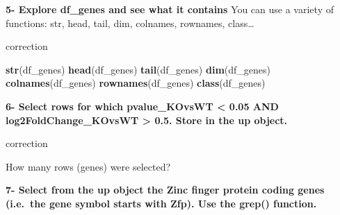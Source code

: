 \documentclass[]{book}
\newenvironment{Shaded}{\begin{snugshade}}{\end{snugshade}}
\newcommand{\CommentTok}[1]{\textcolor[rgb]{0.56,0.35,0.01}{\textit{#1}}}
\newcommand{\FloatTok}[1]{\textcolor[rgb]{0.00,0.00,0.81}{#1}}
\newcommand{\KeywordTok}[1]{\textcolor[rgb]{0.13,0.29,0.53}{\textbf{#1}}}
\newcommand{\NormalTok}[1]{#1}
\newcommand{\OperatorTok}[1]{\textcolor[rgb]{0.81,0.36,0.00}{\textbf{#1}}}
\newcommand{\StringTok}[1]{\textcolor[rgb]{0.31,0.60,0.02}{#1}}
\begin{document}
\textbf{5- Explore df\_genes and see what it contains}
You can use a variety of functions: str, head, tail, dim, colnames, rownames, class\ldots{}

correction

\begin{Shaded}
\begin{Highlighting}[]
\KeywordTok{str}\NormalTok{(df_genes)}
\KeywordTok{head}\NormalTok{(df_genes)}
\KeywordTok{tail}\NormalTok{(df_genes)}
\KeywordTok{dim}\NormalTok{(df_genes)}
\KeywordTok{colnames}\NormalTok{(df_genes)}
\KeywordTok{rownames}\NormalTok{(df_genes)}
\KeywordTok{class}\NormalTok{(df_genes)}
\end{Highlighting}
\end{Shaded}

\textbf{6- Select rows for which pvalue\_KOvsWT \textless{} 0.05 AND log2FoldChange\_KOvsWT \textgreater{} 0.5. Store in the up object.}

correction

\begin{Shaded}
\end{Shaded}

How many rows (genes) were selected?

\textbf{7- Select from the up object the Zinc finger protein coding genes (i.e.~the gene symbol starts with Zfp). Use the grep() function.}
\end{document}

